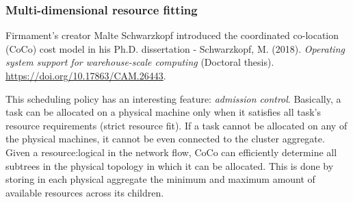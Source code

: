 \subsubsection{Multi-dimensional resource fitting} \label{firmament:multi-dimensions}
Firmament's \cite{firmament} creator Malte Schwarzkopf introduced the coordinated co-location (CoCo) cost model in his Ph.D. dissertation - Schwarzkopf, M. (2018). \textit{Operating system support for warehouse-scale computing} (Doctoral thesis). \href{https://doi.org/10.17863/CAM.26443}{https://doi.org/10.17863/CAM.26443}.\par
This scheduling policy has an interesting feature: \textit{admission control}.
Basically, a task can be allocated on a physical machine only when it satisfies all task's resource requirements (strict resource fit).
If a task cannot be allocated on any of the physical machines, it cannot be even connected to the cluster aggregate.
Given a \gls{resource:logical} in the network flow, CoCo can efficiently determine all subtrees in the physical topology in which it can be allocated.
This is done by storing in each physical aggregate the minimum and maximum amount of available resources across its children.